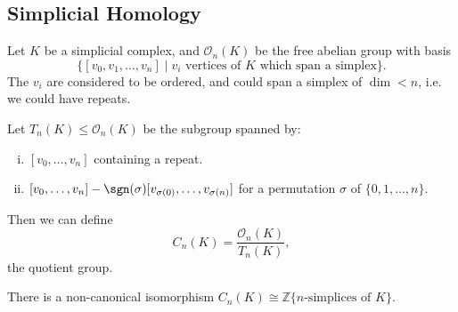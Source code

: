 \documentclass[12pt]{article}
\begin{document}

\subsection{Simplicial Homology}
\label{sub:simp_hom}

\begin{definition}
	Let $K$ be a simplicial complex, and $\mathcal{O}_n(K)$ be the free abelian group with basis
	\[
		\{[v_0, v_1, \ldots, v_n] \mid v_i \text{ vertices of $K$ which span a simplex}\}.
	\]
	The $v_i$ are considered to be ordered, and could span a simplex of $\dim< n$, i.e. we could have repeats.

	Let $T_n(K) \leq \mathcal{O}_n(K)$ be the subgroup spanned by:
	\begin{enumerate}[(i)]
		\item $[v_0, \ldots, v_n]$ containing a repeat.
		\item $[v_0, \ldots, v_n] - \sgn(\sigma) [v_{\sigma(0)}, \ldots, v_{\sigma(n)}]$ for a permutation $\sigma$ of $\{0, 1, \ldots, n\}$.
	\end{enumerate}
	Then we can define
	\[
	C_n(K) = \frac{\mathcal{O}_n(K)}{T_n(K)},
	\]
	the quotient group.
\end{definition}

\begin{lemma}
	There is a non-canonical isomorphism $C_n(K) \cong \mathbb{Z}\{n\text{-simplices of } K\}$.
\end{lemma}
\end{document}
